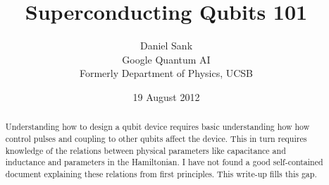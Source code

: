 \documentclass[twocolumn]{article}
\title{Superconducting Qubits 101}
\author{Daniel Sank \\
\small Google Quantum AI \\
\small Formerly Department of Physics, UCSB}
\date{19 August 2012}
\begin{document}
\maketitle

\begin{abstract}
Understanding how to design a qubit device requires basic understanding how how control pulses and coupling to other qubits affect the device.
This in turn requires knowledge of the relations between physical parameters like capacitance and inductance and parameters in the Hamiltonian.
I have not found a good self-contained document explaining these relations from first principles.
This write-up fills this gap.
\end{abstract}





\end{document}

